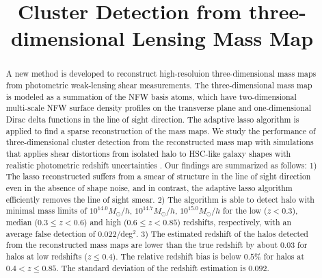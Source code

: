 \documentclass[twocolumn]{aastex63}
\begin{document}
\title{Cluster Detection from three-dimensional Lensing Mass Map}

\begin{abstract}
A new method is developed to reconstruct high-resoluion three-dimensional mass
maps from photometric weak-lensing shear measurements. The three-dimensional
mass map is modeled as a summation of the NFW basis atoms, which have
two-dimensional multi-scale NFW surface density profiles on the transverse
plane and one-dimensional Dirac delta functions in the line of sight direction.
The adaptive lasso algorithm is applied to find a sparse reconstruction of the
mass maps.
We study the performance of three-dimensional cluster detection from the
reconstructed mass map with simulations that applies shear distortions from
isolated halo to HSC-like galaxy shapes with realistic photometric redshift
uncertainties .
Our findings are summarized as follows:
1) The lasso reconstructed suffers from a smear of structure in the line of
sight direction even in the absence of shape noise, and in contrast, the
adaptive lasso algorithm efficiently removes the line of sight smear.
2) The algorithm is able to detect halo with minimal mass limits of $10^{14.0}
M_{\odot}/h$, $10^{14.7} M_{\odot}/h$, $10^{15.0} M_{\odot}/h$ for the low
($z<0.3$), median ($0.3\leq z< 0.6$) and high ($0.6\leq z< 0.85$) redshifts,
respectively, with an average false detection of 0.022/deg$^2$.
3) The estimated redshift of the halos detected from the reconstructed mass
maps are lower than the true redshift by about $0.03$ for halos at low
redshifts ($z\leq 0.4$). The relative redshift bias is below $0.5\%$ for halos
at $0.4<z\leq 0.85$. The standard deviation of the redshift estimation is $0.092$.
\end{abstract}
\end{document}
